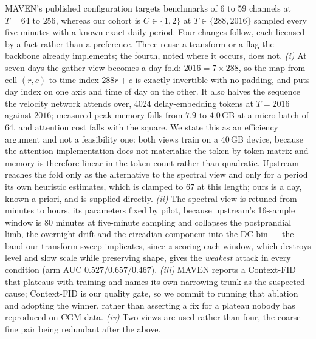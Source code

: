 \documentclass[journal]{IEEEtran}
\begin{document}
MAVEN's published configuration targets benchmarks of 6 to 59 channels at $T=64$ to $256$,
whereas our cohort is $C\in\{1,2\}$ at $T\in\{288,2016\}$ sampled every five minutes with a
known exact daily period. Four changes follow, each licensed by a fact rather than a
preference. Three reuse a transform or a flag the backbone already implements; the fourth,
noted where it occurs, does not.
\emph{(i)} At seven days the gather view becomes a day fold: $2016=7\times288$, so the map
from cell $(r,c)$ to time index $288r+c$ is exactly invertible with no padding, and puts day
index on one axis and time of day on the other. It also halves the sequence the velocity
network attends over, $4024$ delay-embedding tokens at $T=2016$ against $2016$; measured
peak memory falls from $7.9$ to $4.0$\,GB at a micro-batch of 64, and attention cost falls
with the square. We state this as an efficiency argument and not a feasibility one: both
views train on a 40\,GB device, because the attention implementation does not materialise
the token-by-token matrix and memory is therefore linear in the token count rather than
quadratic. Upstream reaches the fold only as the alternative to the
spectral view and only for a period its own heuristic estimates, which is clamped to $67$ at
this length; ours is a day, known a priori, and is supplied directly. \emph{(ii)} The spectral view is retuned
from minutes to hours, its parameters fixed by pilot, because upstream's 16-sample window is
80 minutes at five-minute sampling and collapses the postprandial limb, the overnight drift
and the circadian component into the DC bin --- the band our transform sweep implicates,
since $z$-scoring each window, which destroys level and slow scale while preserving shape,
gives the \emph{weakest} attack in every condition (arm AUC $0.527/0.657/0.467$).
\emph{(iii)} MAVEN reports a Context-FID that plateaus with training and names its own
narrowing trunk as the suspected cause; Context-FID is our quality gate, so we commit to
running that ablation and adopting the winner, rather than asserting a fix for a plateau
nobody has reproduced on CGM data. \emph{(iv)} Two views are used rather than four, the
coarse--fine pair being redundant after the above.
\end{document}
